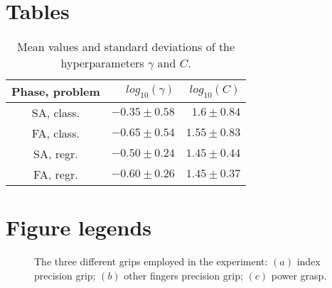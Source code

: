 \documentclass[10pt]{bmc_article}
\def\texttt{[image: ]}
\newenvironment{bmcformat}{\begin{raggedright}\baselineskip20pt\sloppy\setboolean{publ}{false}}{\end{raggedright}\baselineskip20pt\sloppy}
\begin{document}
\begin{bmcformat}
\section*{Tables}

\begin{table}[!ht] \centering
  \caption{Mean values and standard deviations of the hyperparameters $\gamma$ and $C$.}
  \begin{tabular}{|c|r|r|}
    \hline
    Phase, problem & $log_{10}(\gamma)$ & $log_{10}(C)$ \\
    \hline
    SA, class.     & $-0.35 \pm 0.58$   & $1.6  \pm 0.84$ \\
    FA, class.     & $-0.65 \pm 0.54$   & $1.55 \pm 0.83$ \\
    SA, regr.      & $-0.50 \pm 0.24$   & $1.45 \pm 0.44$ \\
    FA, regr.      & $-0.60 \pm 0.26$   & $1.45 \pm 0.37$ \\
    \hline
  \end{tabular}
  \label{tab:hyp}
\end{table}

\section*{Figure legends}


\begin{figure}[!t] \centering
  \caption{The three different grips employed in the experiment: $(a)$
   index precision grip; $(b)$ other fingers precision grip; $(c)$
   power grasp.}
  \label{fig:Grasps}
\end{figure}


\end{bmcformat}
\end{document}
